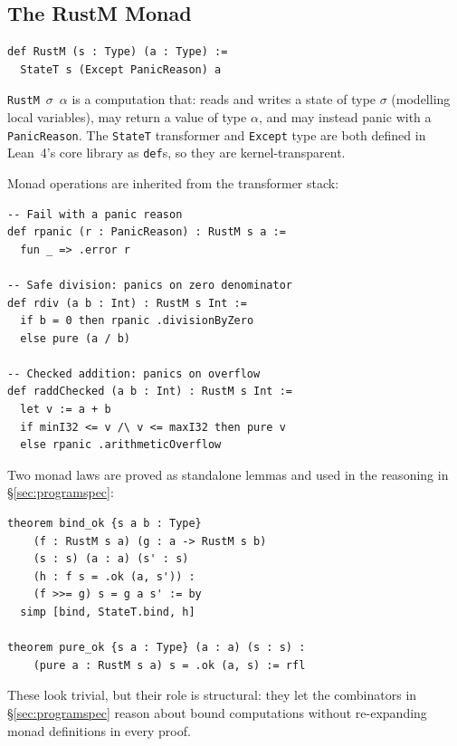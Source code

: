 \subsection{The RustM Monad}

\begin{lstlisting}[caption={RustM monad definition.},label={lst:rustm}]
def RustM (s : Type) (a : Type) :=
  StateT s (Except PanicReason) a
\end{lstlisting}

\texttt{RustM}~$\sigma$~$\alpha$ is a computation that: reads and writes a
state of type $\sigma$ (modelling local variables), may return a value of
type $\alpha$, and may instead panic with a \texttt{PanicReason}. The
\texttt{StateT} transformer and \texttt{Except} type are both defined in
Lean~4's core library as \texttt{def}s, so they are kernel-transparent.

Monad operations are inherited from the transformer stack:

\begin{lstlisting}[caption={Derived monad operations.},label={lst:monadops}]
-- Fail with a panic reason
def rpanic (r : PanicReason) : RustM s a :=
  fun _ => .error r

-- Safe division: panics on zero denominator
def rdiv (a b : Int) : RustM s Int :=
  if b = 0 then rpanic .divisionByZero
  else pure (a / b)

-- Checked addition: panics on overflow
def raddChecked (a b : Int) : RustM s Int :=
  let v := a + b
  if minI32 <= v /\ v <= maxI32 then pure v
  else rpanic .arithmeticOverflow
\end{lstlisting}

Two monad laws are proved as standalone lemmas and used in the
\ProgramSpec reasoning in \S\ref{sec:programspec}:

\begin{lstlisting}[caption={Monad laws for RustM.},label={lst:monadlaws}]
theorem bind_ok {s a b : Type}
    (f : RustM s a) (g : a -> RustM s b)
    (s : s) (a : a) (s' : s)
    (h : f s = .ok (a, s')) :
    (f >>= g) s = g a s' := by
  simp [bind, StateT.bind, h]

theorem pure_ok {s a : Type} (a : a) (s : s) :
    (pure a : RustM s a) s = .ok (a, s) := rfl
\end{lstlisting}

These look trivial, but their role is structural: they let the \ProgramSpec
combinators in \S\ref{sec:programspec} reason about bound computations without
re-expanding monad definitions in every proof.

